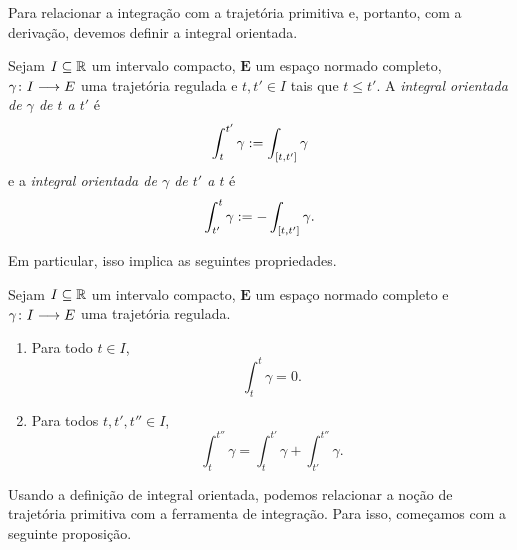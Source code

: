 Para relacionar a integração com a trajetória primitiva e, portanto, com a derivação, devemos definir a integral orientada.

\begin{definition}
Sejam $I \subseteq \mathbb{R}$ um intervalo compacto, $\bm E$ um espaço normado completo, $\gamma\colon \allowbreak I \longrightarrow E$ uma trajetória regulada e $t,t' \in I$ tais que $t \leq t'$. A \emph{integral orientada de $\gamma$ de $t$ a $t'$} é
	\begin{equation*}
	\int_{t}^{t'} \gamma := \int_{\left[t,\allowbreak t'\right]} \gamma
	\end{equation*}
e a \emph{integral orientada de $\gamma$ de $t'$ a $t$} é
	\begin{equation*}
	\int_{t'}^{t} \gamma := - \int_{\left[t,\allowbreak t'\right]} \gamma.
	\end{equation*}
\end{definition}

Em particular, isso implica as seguintes propriedades.

\begin{exercise}
Sejam $I \subseteq \mathbb{R}$ um intervalo compacto, $\bm E$ um espaço normado completo e $\gamma\colon \allowbreak I \longrightarrow E$ uma trajetória regulada.
	\begin{enumerate}
	\item Para todo $t \in I$,
		\begin{equation*}
		\int_t^t \gamma = 0.
		\end{equation*}
	\item Para todos $t,t',t'' \in I$,
		\begin{equation*}
		\int_{t}^{t''} \gamma = \int_{t}^{t'} \gamma + \int_{t'}^{t''} \gamma.
		\end{equation*}
	\end{enumerate}
\end{exercise}

Usando a definição de integral orientada, podemos relacionar a noção de trajetória primitiva com a ferramenta de integração. Para isso, começamos com a seguinte proposição.

